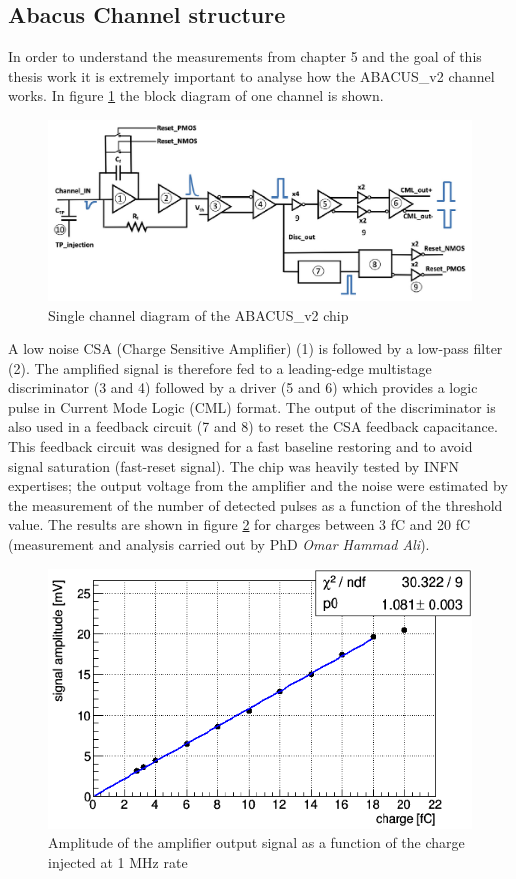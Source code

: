 \subsection{Abacus Channel structure}
In order to understand the measurements from chapter 5 and the goal of this thesis work it is extremely important to analyse how the ABACUS\_v2 channel works.
In figure \ref{fig:abacuschannel} the block diagram of one channel is shown.
\begin{figure}[H]
	\centering
	\includegraphics[width=0.8\linewidth]{IMG/ch2/Abacus_channel.png}
	\caption{Single channel diagram of the ABACUS\_v2 chip}
	\label{fig:abacuschannel}
\end{figure}
\noindent A low noise CSA (Charge Sensitive Amplifier) (1) is followed by a low-pass filter (2).
The amplified signal is therefore fed to a leading-edge multistage discriminator (3 and 4) followed by a driver (5 and 6) which provides a logic pulse in Current Mode Logic (CML) format.
The output of the discriminator is also used in a feedback circuit (7 and 8) to reset the CSA feedback capacitance. This feedback circuit was designed for a fast baseline restoring and to avoid signal saturation (fast-reset signal).
The chip was heavily tested by INFN expertises; the output voltage from the amplifier and the noise were estimated by the measurement of the number of detected pulses as a function of the threshold value. The results are shown in figure \ref{fig:abacustest} for charges between 3 fC and 20 fC (measurement and analysis carried out by PhD \textit{Omar Hammad Ali}).
\begin{figure}[H]
	\centering
	\includegraphics[width=0.6\linewidth]{IMG/ch2/ABACUSTEST}
	\caption{Amplitude of the amplifier output signal as a function of the charge injected at 1 MHz rate}
	\label{fig:abacustest}
\end{figure}
